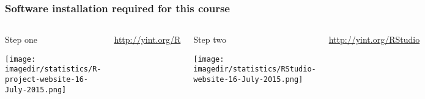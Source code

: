 \begin{frame}\frametitle{Software installation required for this course}
	\begin{columns}[b]
			
			\begin{exampleblock}{\color{red}Step one}
				
				\vspace{10pt}
				\centerline{\texttt{[image: \\imagedir/statistics/R-project-website-16-July-2015.png]}}
			\end{exampleblock}
			
			\vfill
			
			\href{http://yint.org/R}{http://yint.org/R}
		
		
			\begin{exampleblock}{\color{red}Step two}
				\centerline{\texttt{[image: \\imagedir/statistics/RStudio-website-16-July-2015.png]}}
			\end{exampleblock}
			
			\vfill
			\href{http://yint.org/RStudio}{http://yint.org/RStudio}
	\end{columns}
		
\end{frame}

{
\begin{frame}\frametitle{}
\end{frame}}

{
\begin{frame}\frametitle{}
\end{frame}}

{
\begin{frame}\frametitle{}
\end{frame}}
